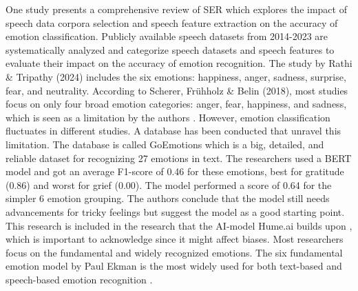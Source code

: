 One study \autocite{Rathi2024} presents a comprehensive review of SER which explores the impact of speech data corpora selection and speech feature extraction on the accuracy of emotion classification. Publicly available speech datasets from 2014-2023 are systematically analyzed and categorize speech datasets and speech features to evaluate their impact on the accuracy of emotion recognition. The study by Rathi \& Tripathy (2024) includes the six emotions: happiness, anger, sadness, surprise, fear, and neutrality. According to Scherer, Frühholz \& Belin (2018), most studies focus on only four broad emotion categories: anger, fear, happiness, and sadness, which is seen as a limitation by the authors \autocite{Scherer2018}. However, emotion classification fluctuates in different studies. A database has been conducted that unravel this limitation. The database is called GoEmotions \autocite{Demszky2020} which is a big, detailed, and reliable dataset for recognizing 27 emotions in text. The researchers \autocite{Demszky2020} used a BERT model and got an average F1-score of 0.46 for these emotions, best for gratitude (0.86) and worst for grief (0.00). The model performed a score of 0.64 for the simpler 6 emotion grouping. The authors conclude that the model still needs advancements for tricky feelings but suggest the model as a good starting point. This research is included in the research that the AI-model Hume.ai builds upon \autocite{HumeAI-AboutHume}, which is important to acknowledge since it might affect biases. Most researchers focus on the fundamental and widely recognized emotions. The six fundamental emotion model by Paul Ekman is the most widely used for both text-based and speech-based emotion recognition \autocite{Maruf2024}.

